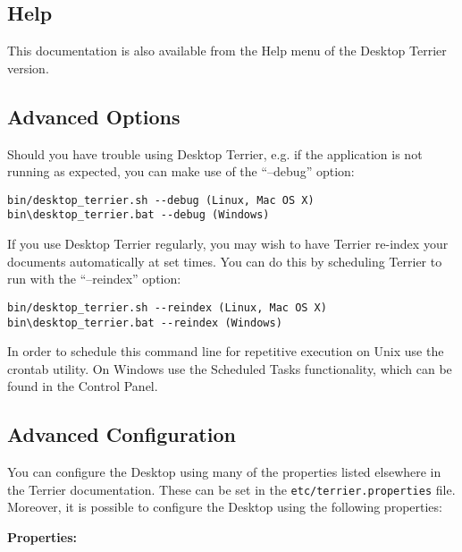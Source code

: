 \subsection{Help}\label{help}

This documentation is also available from the Help menu of the Desktop
Terrier version.

\subsection{Advanced Options}\label{advanced-options}

Should you have trouble using Desktop Terrier, e.g. if the application
is not running as expected, you can make use of the ``--debug'' option:

\begin{verbatim}
bin/desktop_terrier.sh --debug (Linux, Mac OS X)
bin\desktop_terrier.bat --debug (Windows)
\end{verbatim}

If you use Desktop Terrier regularly, you may wish to have Terrier
re-index your documents automatically at set times. You can do this by
scheduling Terrier to run with the ``--reindex'' option:

\begin{verbatim}
bin/desktop_terrier.sh --reindex (Linux, Mac OS X)
bin\desktop_terrier.bat --reindex (Windows)
\end{verbatim}

In order to schedule this command line for repetitive execution on Unix
use the crontab utility. On Windows use the Scheduled Tasks
functionality, which can be found in the Control Panel.

\subsection{Advanced Configuration}\label{advanced-configuration}

You can configure the Desktop using many of the properties listed
elsewhere in the Terrier documentation. These can be set in the
\texttt{etc/terrier.properties} file. Moreover, it is possible to
configure the Desktop using the following properties:

\textbf{Properties:}

